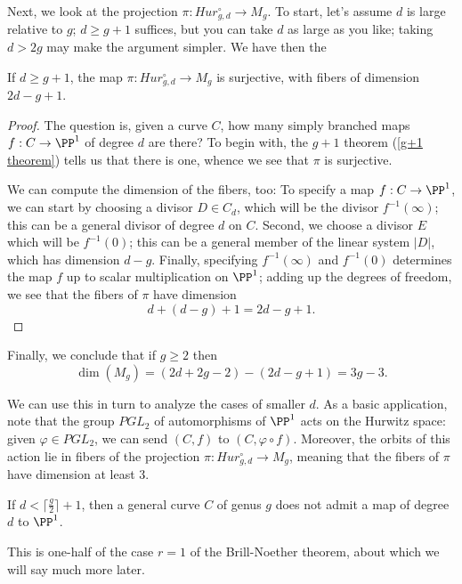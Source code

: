 Next, we look at the projection $\pi : Hur^\circ_{g,d} \to M_g$. To start, let's assume $d$ is large relative to $g$; $d \geq g+1$ suffices, but you can take $d$ as large as you like; taking $d > 2g$ may make the argument simpler. We have then the

\begin{proposition}
If $d \geq g+1$, the map $\pi : Hur^\circ_{g,d} \to M_g$ is surjective, with fibers of dimension $2d-g+1$.
\end{proposition}

\begin{proof}
The question is, given a curve $C$, how many simply branched maps $f : C \to \PP^1$ of degree $d$ are there? To begin with, the $g+1$ theorem (\ref{g+1 theorem}) tells us that there is one, whence we see that $\pi$ is surjective. 

We can compute the dimension of the fibers, too: To specify a map $f : C \to \PP^1$, we can start by choosing a divisor $D \in C_d$, which will be the divisor $f^{-1}(\infty)$; this can be a general divisor of degree $d$ on $C$. Second, we choose a divisor $E$ which will be $f^{-1}(0)$; this can be a general member of the linear system $|D|$, which has dimension $d-g$. Finally, specifying $f^{-1}(\infty)$ and $f^{-1}(0)$ determines the map $f$ up to scalar multiplication on $\PP^1$; adding up the degrees of freedom, we see that the fibers of $\pi$ have dimension
$$
d + (d-g) + 1 = 2d-g+1.
$$ 
\end{proof}

Finally, we conclude that if $g\geq2$ then
$$
\dim(M_g) = (2d+2g-2) - (2d - g + 1) = 3g-3.
$$

We can use this in turn to analyze the cases of smaller $d$. As a basic application, note that the group $PGL_2$ of automorphisms of $\PP^1$ acts on the Hurwitz space: given $\varphi \in PGL_2$, we can send $(C,f)$ to $(C, \varphi \circ f)$. Moreover, the orbits of this action lie in fibers of the projection $\pi : Hur^\circ_{g,d} \to M_g$, meaning that the fibers of $\pi$ have dimension at least 3. 

\begin{corollary}\label{branched cover BN}
If $d < \lceil \frac{g}{2} \rceil + 1$, then a general curve $C$ of genus $g$ does not admit a map of degree $d$ to $\PP^1$.
\end{corollary}

This is one-half of the case $r=1$ of the Brill-Noether theorem, about which we will say much more later.

